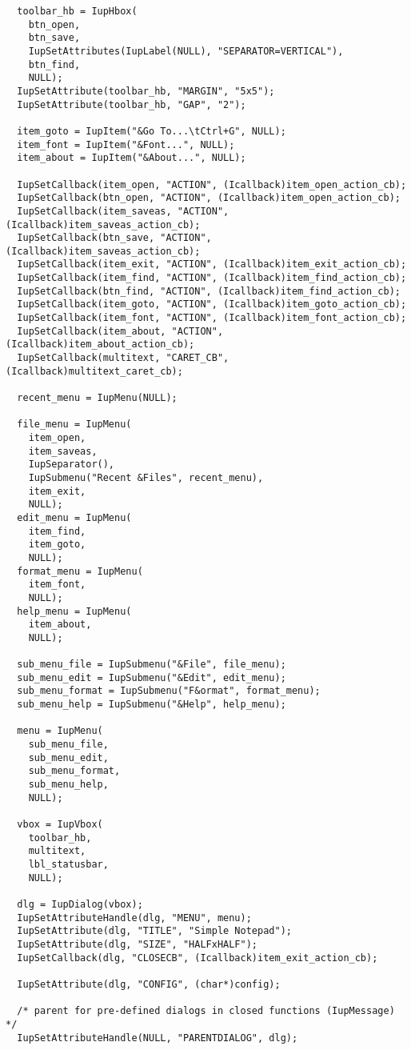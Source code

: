 \documentclass{ctexart}
\begin{document}
\begin{lstlisting}
  toolbar_hb = IupHbox(
    btn_open,
    btn_save,
    IupSetAttributes(IupLabel(NULL), "SEPARATOR=VERTICAL"),
    btn_find,
    NULL);
  IupSetAttribute(toolbar_hb, "MARGIN", "5x5");
  IupSetAttribute(toolbar_hb, "GAP", "2");

  item_goto = IupItem("&Go To...\tCtrl+G", NULL);
  item_font = IupItem("&Font...", NULL);
  item_about = IupItem("&About...", NULL);

  IupSetCallback(item_open, "ACTION", (Icallback)item_open_action_cb);
  IupSetCallback(btn_open, "ACTION", (Icallback)item_open_action_cb);
  IupSetCallback(item_saveas, "ACTION", (Icallback)item_saveas_action_cb);
  IupSetCallback(btn_save, "ACTION", (Icallback)item_saveas_action_cb);
  IupSetCallback(item_exit, "ACTION", (Icallback)item_exit_action_cb);
  IupSetCallback(item_find, "ACTION", (Icallback)item_find_action_cb);
  IupSetCallback(btn_find, "ACTION", (Icallback)item_find_action_cb);  
  IupSetCallback(item_goto, "ACTION", (Icallback)item_goto_action_cb);
  IupSetCallback(item_font, "ACTION", (Icallback)item_font_action_cb);
  IupSetCallback(item_about, "ACTION", (Icallback)item_about_action_cb);
  IupSetCallback(multitext, "CARET_CB", (Icallback)multitext_caret_cb);

  recent_menu = IupMenu(NULL);

  file_menu = IupMenu(
    item_open,
    item_saveas,
    IupSeparator(),
    IupSubmenu("Recent &Files", recent_menu),
    item_exit,
    NULL);
  edit_menu = IupMenu(
    item_find,
    item_goto,
    NULL);
  format_menu = IupMenu(
    item_font,
    NULL);
  help_menu = IupMenu(
    item_about,
    NULL);

  sub_menu_file = IupSubmenu("&File", file_menu);
  sub_menu_edit = IupSubmenu("&Edit", edit_menu);
  sub_menu_format = IupSubmenu("F&ormat", format_menu);
  sub_menu_help = IupSubmenu("&Help", help_menu);

  menu = IupMenu(
    sub_menu_file,
    sub_menu_edit,
    sub_menu_format,
    sub_menu_help,
    NULL);

  vbox = IupVbox(
    toolbar_hb,
    multitext,
    lbl_statusbar,
    NULL);

  dlg = IupDialog(vbox);
  IupSetAttributeHandle(dlg, "MENU", menu);
  IupSetAttribute(dlg, "TITLE", "Simple Notepad");
  IupSetAttribute(dlg, "SIZE", "HALFxHALF");
  IupSetCallback(dlg, "CLOSECB", (Icallback)item_exit_action_cb);

  IupSetAttribute(dlg, "CONFIG", (char*)config);

  /* parent for pre-defined dialogs in closed functions (IupMessage) */
  IupSetAttributeHandle(NULL, "PARENTDIALOG", dlg);


\end{lstlisting}
\end{document}
